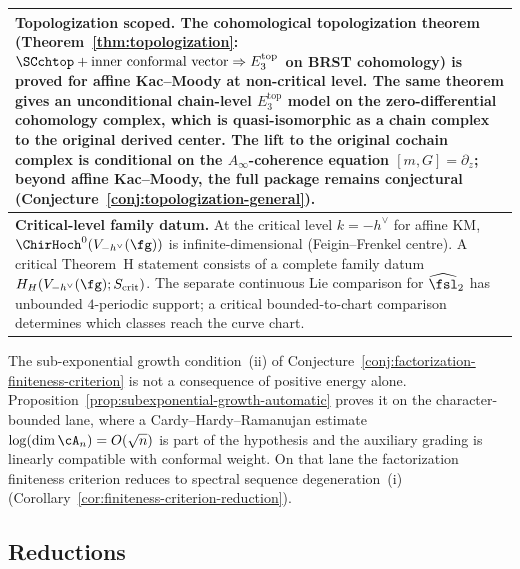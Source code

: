 \begin{center}
\begin{tabular}{lp{8cm}l}
\hline
\multicolumn{3}{p{13cm}}{%
 \textbf{Topologization scoped.}
 The cohomological topologization theorem
 (Theorem~\ref{thm:topologization}:
 $\SCchtop + \text{inner conformal vector}
 \Rightarrow E_3^{\mathrm{top}}$ on BRST cohomology)
 is proved for affine Kac--Moody at non-critical level.
 The same theorem gives an unconditional chain-level
 $E_3^{\mathrm{top}}$ model on the zero-differential
 cohomology complex, which is quasi-isomorphic as a chain
 complex to the original derived center. The lift to the
 original cochain complex is conditional on the
 $A_\infty$-coherence equation
 $[m,G]=\partial_z$; beyond affine Kac--Moody, the full
 package remains conjectural
 (Conjecture~\ref{conj:topologization-general}).} \\
\hline
\multicolumn{3}{p{13cm}}{%
 \textbf{Critical-level family datum.}
 At the critical level $k = -h^\vee$ for affine KM,
 $\ChirHoch^0(V_{-h^\vee}(\fg))$ is infinite-dimensional
 (Feigin--Frenkel centre).  A critical Theorem~H statement consists
 of a complete family datum $H_H(V_{-h^\vee}(\fg);S_{\mathrm{crit}})$.
 The separate continuous Lie comparison for
 $\widehat{\fsl}_2$ has unbounded $4$-periodic support; a critical
 bounded-to-chart comparison determines which classes reach the curve
 chart.} \\
\end{tabular}
\end{center}

\noindent
The sub-exponential growth condition~(ii) of
Conjecture~\ref{conj:factorization-finiteness-criterion} is
not a consequence of positive energy alone.
Proposition~\ref{prop:subexponential-growth-automatic} proves it on
the character-bounded lane, where a Cardy--Hardy--Ramanujan estimate
$\log(\dim \cA_n)=O(\sqrt n)$ is part of the hypothesis and the
auxiliary grading is linearly compatible with conformal weight.
On that lane the factorization finiteness criterion reduces to
spectral sequence degeneration~(i)
(Corollary~\ref{cor:finiteness-criterion-reduction}).

\subsection{Reductions}\label{subsec:concordance-reductions}

